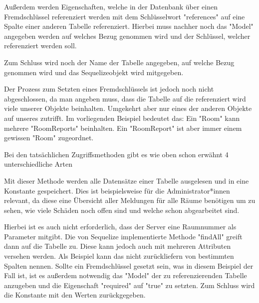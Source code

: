 Außerdem werden Eigenschaften, welche in der Datenbank über einen Fremdschlüssel referenziert werden mit dem Schlüsselwort "references" auf eine Spalte einer anderen Tabelle referenziert. Hierbei muss nachher noch das "Model" angegeben werden auf welches Bezug genommen wird und der Schlüssel, welcher referenziert werden soll.

Zum Schluss wird noch der Name der Tabelle angegeben, auf welche Bezug genommen wird und das Sequelizeobjekt wird mitgegeben.


Der Prozess zum Setzten eines Fremdschlüssels ist jedoch noch nicht abgeschlossen, da man angeben muss, dass die Tabelle auf die referenziert wird viele unserer Objekte beinhalten. Umgekehrt aber nur eines der anderen Objekte auf unseres zutrifft. Im vorliegenden Beispiel bedeutet das: Ein "Room" kann mehrere "RoomReports" beinhalten. Ein "RoomReport" ist aber immer einem gewissen "Room" zugeordnet.


Bei den tatsächlichen Zugriffsmethoden gibt es wie oben schon erwähnt 4 unterschiedliche Arten


Mit dieser Methode werden alle Datensätze einer Tabelle ausgelesen und in eine Konstante gespeichert. Dies ist beispielsweise für die Administrator*innen relevant, da diese eine Übersicht aller Meldungen für alle Räume benötigen um zu sehen, wie viele Schäden noch offen sind und welche schon abgearbeitet sind.

Hierbei ist es auch nicht erforderlich, dass der Server eine Raumnummer als Parameter mitgibt. Die von Sequelize implementierte Methode "findAll" greift dann auf die Tabelle zu. Diese kann jedoch auch mit mehreren Attributen versehen werden. Als Beispiel kann das nicht zurückliefern von bestimmten Spalten nennen. Sollte ein Fremdschlüssel gesetzt sein, was in diesem Beispiel der Fall ist, ist es außerdem notwendig das "Model" der zu referenzierenden Tabelle anzugeben und die Eigenschaft "required" auf "true" zu setzten. Zum Schluss wird die Konstante mit den Werten zurückgegeben.




